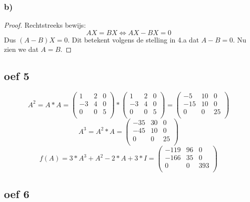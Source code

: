 \documentclass[10pt,a4paper]{article}
\begin{document}
\subsubsection*{b)}
\begin{proof}
Rechtstreeks bewijs:\\
\[
AX=BX \Leftrightarrow AX - BX=0
\]
Dus $(A-B)X=0$.
Dit betekent volgens de stelling in 4.a dat $A-B=0$.
Nu zien we dat $A=B$.
\end{proof}

\subsection*{oef 5}
\[
   A^2 = A*A = \left( \begin{array}{ccc}
    1 & 2 & 0 \\
    -3 & 4 & 0 \\
    0 & 0 & 5 \\
  \end{array} \right) * \left( \begin{array}{ccc}
    1 & 2 & 0 \\
    -3 & 4 & 0 \\
    0 & 0 & 5 \\
  \end{array} \right) = \left( \begin{array}{ccc}
    -5 & 10 & 0 \\
    -15 & 10 & 0 \\
    0 & 0 & 25 \\
  \end{array} \right) 
  \]
\[ 
  A^3 = A^2 * A = \left( \begin{array}{ccc}
    -35 & 30 & 0 \\
    -45 & 10 & 0 \\
    0 & 0 & 25 \\
  \end{array} \right)
\]
\[
f(A) = 3*A^3 + A^2 - 2*A + 3*I =  \left( \begin{array}{ccc}
    -119 & 96 & 0 \\
    -166 & 35 & 0 \\
    0 & 0 & 393 \\
  \end{array} \right)
\]
\subsection*{oef 6}
\end{document}
